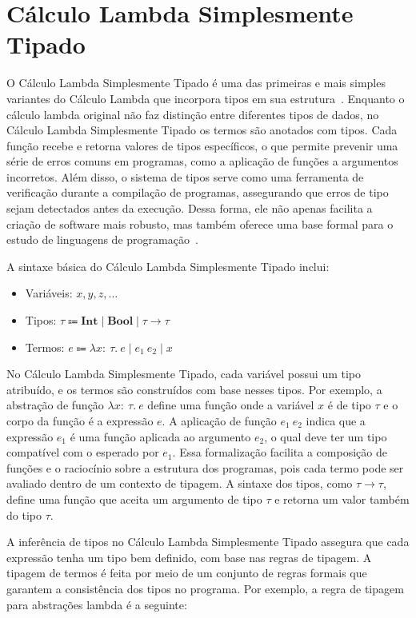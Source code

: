 \section{Cálculo Lambda Simplesmente Tipado}\label{sec:simply-typed-lambda-calculus}

O Cálculo Lambda Simplesmente Tipado é uma das primeiras e mais simples variantes do Cálculo Lambda que incorpora tipos em sua estrutura~\cite{church1940formulation}.
Enquanto o cálculo lambda original não faz distinção entre diferentes tipos de dados, no Cálculo Lambda Simplesmente Tipado os termos são anotados com tipos.
Cada função recebe e retorna valores de tipos específicos, o que permite prevenir uma série de erros comuns em programas, como a aplicação de funções a argumentos incorretos.
Além disso, o sistema de tipos serve como uma ferramenta de verificação durante a compilação de programas, assegurando que erros de tipo sejam detectados antes da execução.
Dessa forma, ele não apenas facilita a criação de software mais robusto, mas também oferece uma base formal para o estudo de linguagens de programação~\cite{pierce2002types}.

A sintaxe básica do Cálculo Lambda Simplesmente Tipado inclui:

\begin{itemize}
  \item Variáveis: $x, y, z, \ldots$
  \item Tipos: $\tau \Coloneqq \mathbf{Int} \mid \mathbf{Bool} \mid \tau \to \tau$
  \item Termos: $e \Coloneqq \lambda x{:}\ \tau.\ e \mid e_1\ e_2 \mid x$
\end{itemize}

No Cálculo Lambda Simplesmente Tipado, cada variável possui um tipo atribuído, e os termos são construídos com base nesses tipos.
Por exemplo, a abstração de função $\lambda x{:}\ \tau.\ e$ define uma função onde a variável $x$ é de tipo $\tau$ e o corpo da função é a expressão $e$.
A aplicação de função $e_1\ e_2$ indica que a expressão $e_1$ é uma função aplicada ao argumento $e_2$, o qual deve ter um tipo compatível com o esperado por $e_1$.
Essa formalização facilita a composição de funções e o raciocínio sobre a estrutura dos programas, pois cada termo pode ser avaliado dentro de um contexto de tipagem.
A sintaxe dos tipos, como $\tau \to \tau$, define uma função que aceita um argumento de tipo $\tau$ e retorna um valor também do tipo $\tau$.

A inferência de tipos no Cálculo Lambda Simplesmente Tipado assegura que cada expressão tenha um tipo bem definido, com base nas regras de tipagem.
A tipagem de termos é feita por meio de um conjunto de regras formais que garantem a consistência dos tipos no programa.
Por exemplo, a regra de tipagem para abstrações lambda é a seguinte:

